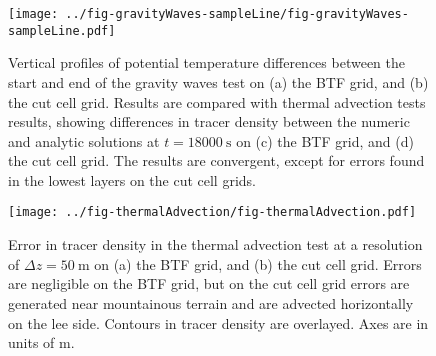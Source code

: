 \documentclass{ametsoc}
\begin{document}
\begin{figure*}
	\centering
	\texttt{[image: ../fig-gravityWaves-sampleLine/fig-gravityWaves-sampleLine.pdf]}
%
	\caption{Vertical profiles of potential temperature differences between the start and end of the gravity waves test on (a) the BTF grid, and (b) the cut cell grid.  Results are compared with thermal advection tests results, showing differences in tracer density between the numeric and analytic solutions at $t = \SI{18000}{\second}$ on (c) the BTF grid, and (d) the cut cell grid.  The results are convergent, except for errors found in the lowest layers on the cut cell grids.}
	\label{fig:gw-sampleLine}
\end{figure*}

\begin{figure}
	\centering
	\texttt{[image: ../fig-thermalAdvection/fig-thermalAdvection.pdf]}
%
	\caption{Error in tracer density in the thermal advection test at a resolution of $\Delta z = \SI{50}{\meter}$ on (a) the BTF grid, and (b) the cut cell grid.  Errors are negligible on the BTF grid, but on the cut cell grid errors are generated near mountainous terrain and are advected horizontally on the lee side.  Contours in tracer density are overlayed.  Axes are in units of \si{\meter}.}
	\label{fig:thermalAdvection}
\end{figure}
\end{document}
